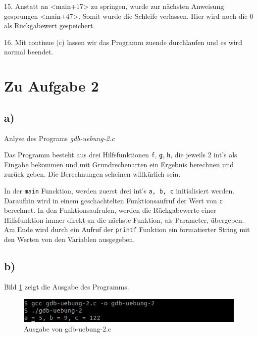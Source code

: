 \documentclass[12pt]{article}
\begin{document}

15. Anstatt an <main+17> zu springen, wurde zur nächsten Anweisung gesprungen <main+47>. Somit wurde die Schleife verlassen. Hier wird noch die 0 als Rückgabewert gespeichert. 


16. Mit continue (c) lassen wir das Programm zuende durchlaufen und es wird normal beendet.


\section{Zu Aufgabe 2}
\subsection{a)}

Anlyse des Programs \textit{gdb-uebung-2.c}



Das Programm besteht aus drei Hilfsfunktionen \texttt{f}, \texttt{g}, \texttt{h}, die jeweils 2 int's als Eingabe bekommen und mit Grundrechenarten ein Ergebnis berechnen und zurück geben. Die Berechnungen scheinen willkürlich sein. 

In der \texttt{main} Funcktion, werden zuerst drei int's \texttt{a, b, c} initialisiert werden. Daraufhin wird in einem geschachtelten Funktionsaufruf der Wert von \texttt{c} berechnet. In den Funktionsaufrufen, werden die Rückgabewerte einer Hilfsfunktion immer direkt an die nächste Funktion, als Parameter, übergeben. Am Ende wird durch ein Aufruf der \texttt{printf} Funktion ein formatierter String mit den Werten von den Variablen ausgegeben.


\subsection{b)}

Bild \ref{fig:aufgabe2b} zeigt die Ausgabe des Programms.
\begin{figure}[h!]
	\includegraphics[width=\textwidth]{Pictures/a2b.png}
	\caption{Ausgabe von gdb-uebung-2.c}
	\label{fig:aufgabe2b}
\end{figure}
\end{document}
